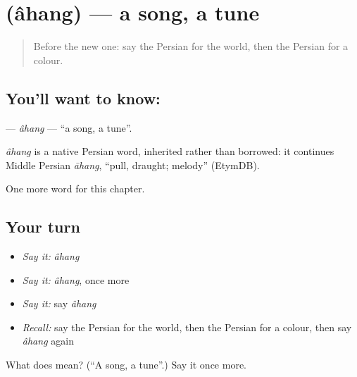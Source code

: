 \section[\texorpdfstring{\fa{آهنگ} (âhang)}{آهنگ (âhang)}]{ (âhang) — a song, a tune}

\label{lesson:FA-C77-ahang}



\begin{quote}
Before the new one: say the Persian for the world, then the Persian for a colour.
\end{quote}

\subsection*{You'll want to know: }
\textbf{} — \emph{âhang} — \textquotedblleft{}a song, a tune\textquotedblright{}.

\begin{cousinweb}
\emph{âhang} is a native Persian word, inherited rather than borrowed: it continues Middle Persian \emph{āhang}, \textquotedblleft{}pull, draught; melody\textquotedblright{} (EtymDB).
\end{cousinweb}

\begin{grammarlens}[title={What you've built}]
One more word for this chapter.
\end{grammarlens}

\subsection*{Your turn}
\begin{itemize}
\raggedright
  \item \emph{Say it:} \emph{âhang}
  \item \emph{Say it:} \emph{âhang}, once more
  \item \emph{Say it:} say \emph{âhang}
  \item \emph{Recall:} say the Persian for the world, then the Persian for a colour, then say \emph{âhang} again
\end{itemize}

\begin{tcolorbox}[breakable,colback=teal!4,colframe=teal!35!black,title={Before you move on}]
What does  mean? (\textquotedblleft{}A song, a tune\textquotedblright{}.) Say it once more.
\end{tcolorbox}
